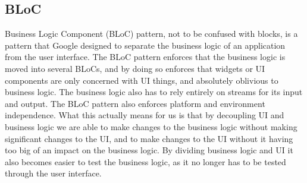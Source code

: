\subsection{BLoC}
Business Logic Component (BLoC) pattern, not to be confused with blocks, is a pattern that Google designed to separate the business logic of an application from the user interface.
The BLoC pattern enforces that the business logic is moved into several BLoCs, and by doing so enforces that widgets or UI components are only concerned with UI things, and absolutely oblivious to business logic. 
The business logic also has to rely entirely on streams for its input and output.
The BLoC pattern also enforces platform and environment independence. 
What this actually means for us is that by decoupling UI and business logic we are able to make changes to the business logic without making significant changes to the UI, and to make changes to the UI without it having too big of an impact on the business logic. 
By dividing business logic and UI it also becomes easier to test the business logic, as it no longer has to be tested through the user interface. 
